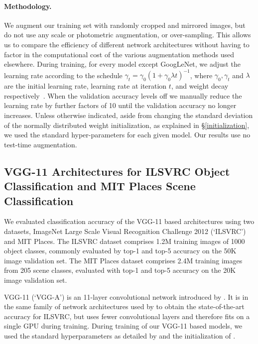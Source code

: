 \documentclass[thesis]{subfiles}
\begin{document}
    \paragraph{Methodology.} We augment our training set with randomly cropped and mirrored images, but do not use any scale or photometric augmentation, or over-sampling. This allows us to compare the efficiency of different network architectures without having to factor in the computational cost of the various augmentation methods used elsewhere. During training, for every model except GoogLeNet, we adjust the learning rate according to the schedule $\gamma_t = \gamma_0(1+\gamma_0\lambda t)^{-1}$, where $\gamma_0,\gamma_t$ and $\lambda$ are the initial learning rate, learning rate at iteration $t$, and weight decay respectively~\citep{bottou2012stochastic}. When the validation accuracy levels off we manually reduce the learning rate by further factors of 10 until the validation accuracy no longer increases. Unless otherwise indicated, aside from changing the standard deviation of the normally distributed weight initialization, as explained in \S\ref{initialization}, we used the standard hyper-parameters for each given model. Our results use no test-time augmentation.  
    
    \subsection{VGG-11 Architectures for ILSVRC Object Classification and MIT Places Scene Classification}
    \label{vggresults}
    We evaluated classification accuracy of the VGG-11 based architectures using two datasets, ImageNet Large Scale Visual Recognition Challenge 2012 (`ILSVRC') and MIT Places. The ILSVRC dataset comprises 1.2M training images of 1000 object classes, commonly evaluated by top-1 and top-5 accuracy on the 50K image validation set. The MIT Places dataset comprises 2.4M training images from 205 scene classes, evaluated with top-1 and top-5 accuracy on the 20K image validation set.
    
    VGG-11 (`VGG-A') is an 11-layer convolutional network introduced by \citet{journals/corr/SimonyanZ14a}. It is in the same family of network architectures used by \citet{journals/corr/SimonyanZ14a,journals/corr/HeZR015} to obtain the state-of-the-art accuracy for ILSVRC, but uses fewer convolutional layers and therefore fits on a single GPU during training. During training of our VGG-11 based models, we used the standard hyperparameters as detailed by \citet{journals/corr/SimonyanZ14a} and the initialization of \citet{journals/corr/HeZR015}.
    
\end{document}
